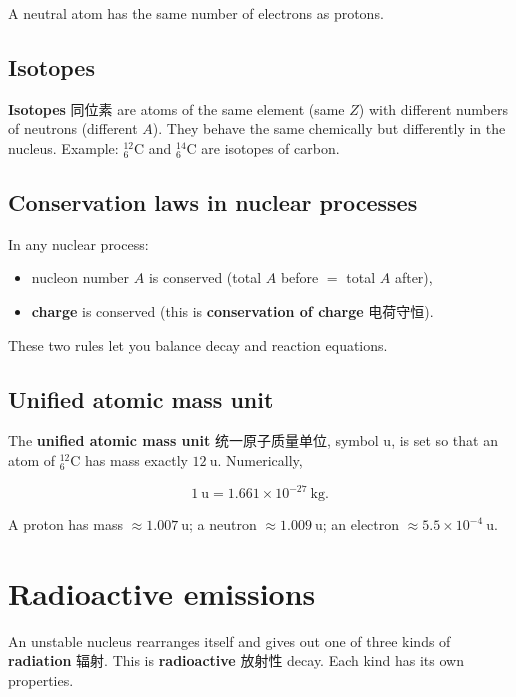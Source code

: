\documentclass[11pt]{article}
\begin{document}
A neutral atom has the same number of electrons as protons.

\subsection*{Isotopes}

\textbf{Isotopes} 同位素 are atoms of the same element (same $Z$) with different numbers of neutrons (different $A$). They behave the same chemically but differently in the nucleus. Example: $^{12}_{6}\text{C}$ and $^{14}_{6}\text{C}$ are isotopes of carbon.

\subsection*{Conservation laws in nuclear processes}

In any nuclear process:

\begin{itemize}
\item nucleon number $A$ is conserved (total $A$ before $=$ total $A$ after),

\item \textbf{charge} is conserved (this is \textbf{conservation of charge} 电荷守恒).

\end{itemize}

These two rules let you balance decay and reaction equations.

\subsection*{Unified atomic mass unit}

The \textbf{unified atomic mass unit} 统一原子质量单位, symbol $\text{u}$, is set so that an atom of $^{12}_{6}\text{C}$ has mass exactly $12\ \text{u}$. Numerically,

\[
1\ \text{u} = 1.661 \times 10^{-27}\ \text{kg}.
\]

A proton has mass $\approx 1.007\ \text{u}$; a neutron $\approx 1.009\ \text{u}$; an electron $\approx 5.5 \times 10^{-4}\ \text{u}$.

\section*{Radioactive emissions}

An unstable nucleus rearranges itself and gives out one of three kinds of \textbf{radiation} 辐射. This is \textbf{radioactive} 放射性 decay. Each kind has its own properties.
\end{document}
